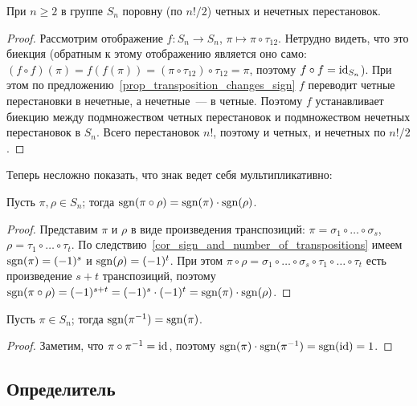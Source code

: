 \begin{corollary}\label{cor_odd_and_even}
При $n\geq 2$ в группе $S_n$ поровну (по $n!/2$) четных и нечетных перестановок.
\end{corollary}
\begin{proof}
Рассмотрим отображение $f\colon S_n\to S_n$, $\pi\mapsto
\pi\circ\tau_{12}$. Нетрудно видеть, что это биекция (обратным к этому
отображению является оно само: $(f\circ
f)(\pi)=f(f(\pi))=(\pi\circ\tau_{12})\circ\tau_{12}=\pi$, поэтому
$f\circ f=\operatorname{id}_{S_n}$). При этом по
предложению~\ref{prop_transposition_changes_sign} $f$ переводит четные
перестановки в нечетные, а нечетные~--- в четные. Поэтому $f$
устанавливает биекцию между подмножеством четных перестановок и
подмножеством нечетных перестановок в $S_n$. Всего перестановок $n!$,
поэтому и четных, и нечетных по $n!/2$.
\end{proof}

Теперь несложно показать, что знак ведет себя мультипликативно:

\begin{theorem}\label{thm:permutation_sign_product}
Пусть $\pi,\rho\in S_n$; тогда
$\operatorname{sgn}(\pi\circ\rho)=\operatorname{sgn}(\pi)\cdot\operatorname{sgn}(\rho)$.
\end{theorem}
\begin{proof}
Представим $\pi$ и $\rho$ в виде произведения транспозиций:
$\pi=\sigma_1\circ\dots\circ\sigma_s$,
$\rho=\tau_1\circ\dots\circ\tau_t$. По
следствию~\ref{cor_sign_and_number_of_transpositions} имеем
$\operatorname{sgn}(\pi)=(-1)^s$ и $\operatorname{sgn}(\rho)=(-1)^t$. При этом
$\pi\circ\rho=\sigma_1\circ\dots\circ\sigma_s\circ\tau_1\circ\dots\circ\tau_t$
есть произведение $s+t$ транспозиций, поэтому $\operatorname{sgn}(\pi\circ\rho)=(-1)^{s+t}=(-1)^s\cdot(-1)^t=\operatorname{sgn}(\pi)\cdot\operatorname{sgn}(\rho)$.
\end{proof}

\begin{corollary}\label{cor:permutation_sign_inverse}
Пусть $\pi\in S_n$; тогда $\operatorname{sgn}(\pi^{-1})=\operatorname{sgn}(\pi)$.
\end{corollary}
\begin{proof}
Заметим, что $\pi\circ\pi^{-1}=\operatorname{id}$, поэтому
$\operatorname{sgn}(\pi)\cdot\operatorname{sgn}(\pi^{-1})=\operatorname{sgn}(\operatorname{id})=1$.
\end{proof}

\subsection{Определитель}\label{ssect:det}

